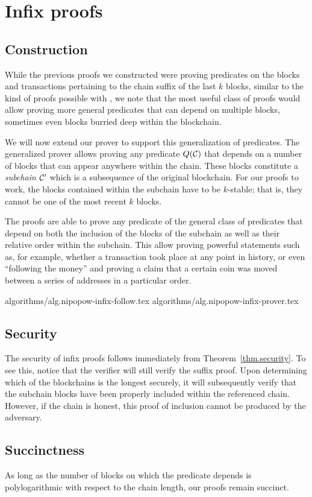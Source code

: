 \section{Infix proofs}

\subsection{Construction}

While the previous proofs we constructed were proving predicates on the blocks
and transactions pertaining to the chain suffix of the last $k$ blocks, similar
to the kind of proofs possible with \cite{KLS}, we note that the most useful
class of proofs would allow proving more general predicates that can depend on
multiple blocks, sometimes even blocks burried deep within the blockchain.

We will now extend our prover to support this generalization of predicates. The
generalized prover allows proving any predicate $Q(\mathcal{C})$ that depends on a
number of blocks that can appear anywhere within the chain. These blocks
constitute a \textit{subchain} $\mathcal{C}'$ which is a subsequence of the original
blockchain. For our proofs to work, the blocks contained within the subchain
have to be $k$-stable; that is, they cannot be one of the most recent $k$
blocks.

The proofs are able to prove any predicate of the general class of predicates
that depend on both the inclusion of the blocks of the subchain as well as
their relative order within the subchain. This allow proving powerful
statements such as, for example, whether a transaction took place at any point
in history, or even ``following the money'' and proving a claim that a certain
coin was moved between a series of addresses in a particular order.

{algorithms/alg.nipopow-infix-follow.tex}
{algorithms/alg.nipopow-infix-prover.tex}

\subsection{Security}
The security of infix proofs follows immediately from
Theorem~\ref{thm.security}. To see this, notice that the verifier will still
verify the suffix proof. Upon determining which of the blockchains is the
longest securely, it will subsequently verify that the subchain blocks have
been properly included within the referenced chain. However, if the chain is
honest, this proof of inclusion cannot be produced by the adversary.

\subsection{Succinctness}
As long as the number of blocks on which the predicate depends is
polylogarithmic with respect to the chain length, our proofs remain succinct.
